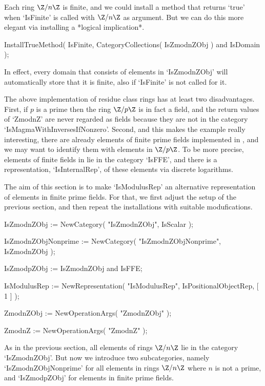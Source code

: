 Each ring $\Z/n\Z$ is finite,
and we could install a method that returns `true' when `IsFinite' is
called with $\Z/n\Z$ as argument.
But we can do this more elegant via installing a *logical implication*.

\beginexample
    InstallTrueMethod( IsFinite,
        CategoryCollections( IsZmodnZObj ) and IsDomain );
\endexample

In effect, every domain that consists of elements in `IsZmodnZObj'
will automatically store that it is finite,
also if `IsFinite' is not called for it.



The above implementation of residue class rings has at least two
disadvantages.
First, if $p$ is a prime then the ring $\Z/p\Z$ is in fact a field,
and the return values of `ZmodnZ' are never regarded as fields because
they are not in the category `IsMagmaWithInversesIfNonzero'.
Second, and this makes the example really interesting,
there are already elements of finite prime fields implemented in {\GAP},
and we may want to identify them with elements in $\Z/p\Z$.
To be more precise,
elements of finite fields in {\GAP} lie in the category `IsFFE',
and there is a representation, `IsInternalRep', of these elements via
discrete logarithms.

The aim of this section is to make `IsModulusRep' an alternative
representation of elements in finite prime fields.
For that, we first adjust the setup of the previous section,
and then repeat the installations with suitable modufications.

\beginexample
    IsZmodnZObj := NewCategory( "IsZmodnZObj", IsScalar );

    IsZmodnZObjNonprime := NewCategory( "IsZmodnZObjNonprime",
        IsZmodnZObj );

    IsZmodpZObj := IsZmodnZObj and IsFFE;

    IsModulusRep := NewRepresentation( "IsModulusRep",
        IsPositionalObjectRep,
        [ 1 ] );

    ZmodnZObj := NewOperationArgs( "ZmodnZObj" );

    ZmodnZ := NewOperationArgs( "ZmodnZ" );
\endexample

As in the previous section,
all elements of rings $\Z/n\Z$ lie in the category `IsZmodnZObj'.
But now we introduce two subcategories, namely `IsZmodnZObjNonprime'
for all elements in rings $\Z/n\Z$ where $n$ is not a prime,
and `IsZmodpZObj' for elements in finite prime fields.

